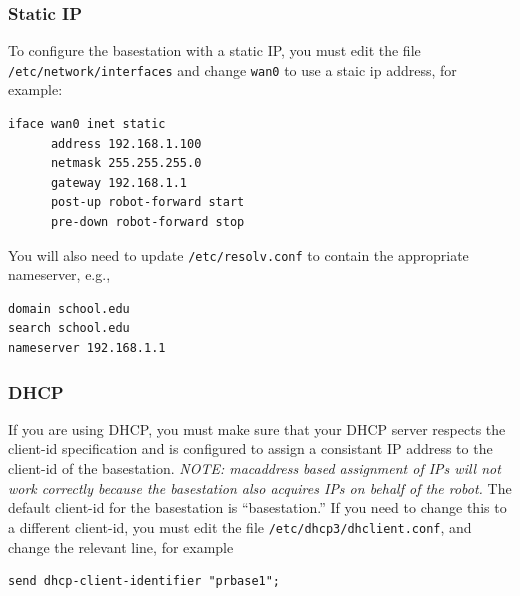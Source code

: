 \subsubsection{Static IP}

To configure the basestation with a static IP, you must edit the file
\texttt{/etc/network/interfaces} and change \texttt{wan0} to use a staic ip
address, for example:
\begin{verbatim}
iface wan0 inet static
      address 192.168.1.100
      netmask 255.255.255.0
      gateway 192.168.1.1
      post-up robot-forward start
      pre-down robot-forward stop
\end{verbatim}
You will also need to update \texttt{/etc/resolv.conf} to contain the
appropriate nameserver, e.g.,
\begin{verbatim}
domain school.edu
search school.edu
nameserver 192.168.1.1
\end{verbatim}

\subsubsection{DHCP}
If you are using DHCP, you must make sure that your DHCP server
respects the client-id specification and is configured to assign a
consistant IP address to the client-id of the basestation.
\textit{NOTE: macaddress based assignment of IPs will not work
  correctly because the basestation also acquires IPs on behalf of the
  robot.}  The default client-id for the basestation is
``basestation.''  If you need to change this to a different client-id,
you must edit the file \texttt{/etc/dhcp3/dhclient.conf}, and change
the relevant line, for example
\begin{verbatim}
send dhcp-client-identifier "prbase1";
\end{verbatim}

